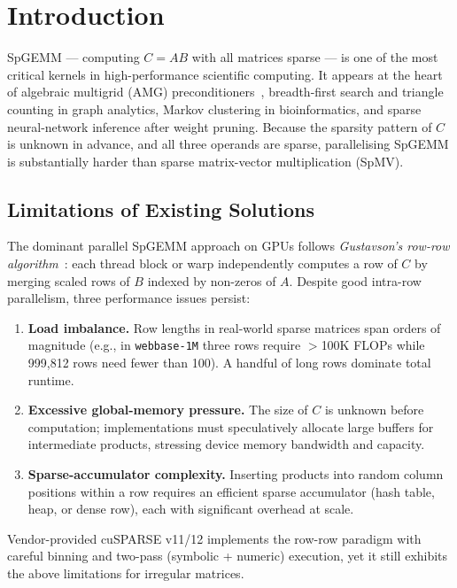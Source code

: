 \documentclass[conference]{IEEEtran}
\begin{document}
\section{Introduction}

SpGEMM --- computing $C = AB$ with all matrices sparse --- is one of the
most critical kernels in high-performance scientific computing.
It appears at the heart of algebraic multigrid (AMG)
preconditioners~\cite{tilespgemm}, breadth-first search and triangle
counting in graph analytics, Markov clustering in bioinformatics, and
sparse neural-network inference after weight pruning.
Because the sparsity pattern of $C$ is unknown in advance, and all three
operands are sparse, parallelising SpGEMM is substantially harder than
sparse matrix-vector multiplication (SpMV).

\subsection*{Limitations of Existing Solutions}

The dominant parallel SpGEMM approach on GPUs follows
\emph{Gustavson's row-row algorithm}~\cite{tilespgemm}: each thread block
or warp independently computes a row of $C$ by merging scaled rows of $B$
indexed by non-zeros of $A$.
Despite good intra-row parallelism, three performance issues persist:

\begin{enumerate}
\item \textbf{Load imbalance.}  Row lengths in real-world sparse
  matrices span orders of magnitude (e.g., in \texttt{webbase-1M} three
  rows require $>$100K FLOPs while 999{,}812 rows need fewer than 100).
  A handful of long rows dominate total runtime.
\item \textbf{Excessive global-memory pressure.}  The size of $C$ is
  unknown before computation; implementations must speculatively allocate
  large buffers for intermediate products, stressing device memory
  bandwidth and capacity.
\item \textbf{Sparse-accumulator complexity.}  Inserting products into
  random column positions within a row requires an efficient sparse
  accumulator (hash table, heap, or dense row), each with significant
  overhead at scale.
\end{enumerate}

Vendor-provided cuSPARSE v11/12 implements the row-row paradigm with
careful binning and two-pass (symbolic + numeric) execution, yet it still
exhibits the above limitations for irregular matrices.
\end{document}
